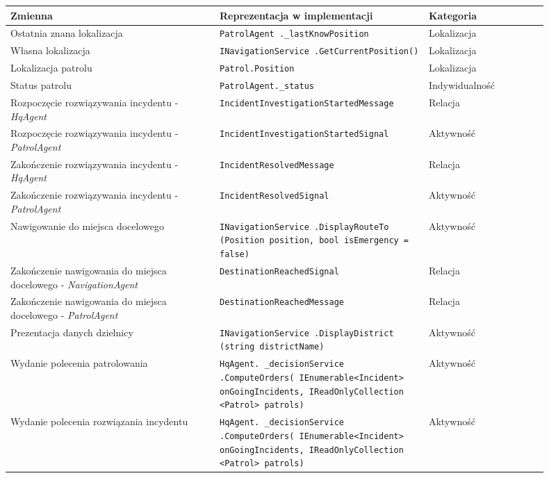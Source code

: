 \begin{longtable}{|p{0.35\linewidth}|p{0.35\linewidth}|p{0.20\linewidth}|}
    \hline
     Zmienna & Reprezentacja w implementacji & Kategoria \\
     \hline
     \hline
     Ostatnia znana lokalizacja & \texttt{PatrolAgent .\_lastKnowPosition} & Lokalizacja \\
     \hline
     Własna lokalizacja & \texttt{INavigationService .GetCurrentPosition()} & Lokalizacja \\
     \hline
     Lokalizacja patrolu & \texttt{Patrol.Position} & Lokalizacja \\
     \hline
     Status patrolu & \texttt{PatrolAgent.\_status} & Indywidualność \\
     \hline
     Rozpoczęcie rozwiązywania incydentu - \emph{HqAgent} & \texttt{Incident\-Investigation\-StartedMessage} & Relacja \\
     \hline
     Rozpoczęcie rozwiązywania incydentu - \emph{PatrolAgent} & \texttt{Incident\-Investigation\-StartedSignal} & Aktywność \\
     \hline
     Zakończenie rozwiązywania incydentu - \emph{HqAgent} & \texttt{Incident\-ResolvedMessage} & Relacja \\
     \hline
     Zakończenie rozwiązywania incydentu - \emph{PatrolAgent} & \texttt{Incident\-ResolvedSignal} & Aktywność \\
     \hline
     Nawigowanie do miejsca docelowego & \texttt{INavigation\-Service .Display\-RouteTo (Position position, bool isEmergency = false)} & Aktywność \\
     \hline
     Zakończenie nawigowania do miejsca docelowego - \emph{NavigationAgent} & \texttt{Destination\-ReachedSignal} & Relacja \\
     \hline
     Zakończenie nawigowania do miejsca docelowego - \emph{PatrolAgent} & \texttt{Destination\-ReachedMessage} & Relacja \\
     \hline
     Prezentacja danych dzielnicy & \texttt{INavigationService .DisplayDistrict (string districtName)} & Aktywność \\
     \hline
     Wydanie polecenia patrolowania & \texttt{HqAgent. \_decisionService .ComputeOrders( IEnumerable<Incident> onGoingIncidents, IReadOnlyCollection <Patrol> patrols)} & Aktywność \\
     \hline
     Wydanie polecenia rozwiązania incydentu & \texttt{HqAgent. \_decisionService .ComputeOrders( IEnumerable<Incident> onGoingIncidents, IReadOnlyCollection <Patrol> patrols)} & Aktywność \\

\end{longtable}

